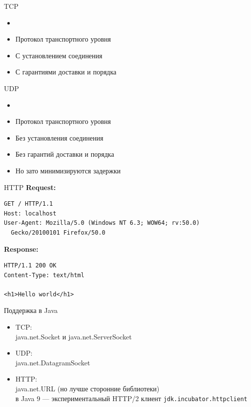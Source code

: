 \documentclass[unicode]{beamer}
\begin{document}
\begin{frame}{TCP}
\begin{itemize}
\item {}
\bigskip
\item Протокол транспортного уровня
\item С установлением соединения
\item С гарантиями доставки и порядка
\end{itemize}
\end{frame}


\begin{frame}{UDP}
\begin{itemize}
\item {}
\bigskip
\item Протокол транспортного уровня
\item Без установления соединения
\item Без гарантий доставки и порядка
\item Но зато минимизируются задержки
\end{itemize}
\end{frame}


\begin{frame}[fragile]{HTTP}
\textbf{Request:}
\begin{verbatim}
GET / HTTP/1.1
Host: localhost
User-Agent: Mozilla/5.0 (Windows NT 6.3; WOW64; rv:50.0)
  Gecko/20100101 Firefox/50.0
\end{verbatim}
\bigskip
\textbf{Response:}
\begin{verbatim}
HTTP/1.1 200 OK
Content-Type: text/html

<h1>Hello world</h1>
\end{verbatim}
\end{frame}


\begin{frame}{Поддержка в Java}
\begin{itemize}
\item TCP:\\
java.net.Socket и java.net.ServerSocket
\bigskip
\item UDP:\\
java.net.DatagramSocket
\bigskip
\item HTTP:\\
java.net.URL (но лучше сторонние библиотеки)\\
в Java 9 --- экспериментальный HTTP/2 клиент \texttt{jdk.incubator.httpclient}
\end{itemize}
\end{frame}
\end{document}
